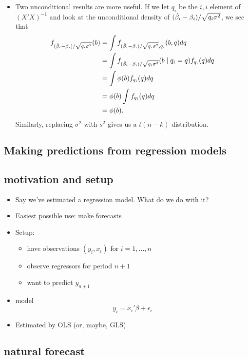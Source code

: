 \begin{itemize}
\item Two unconditional results are more useful.  If we let $q_i$ be
  the $i,i$ element of $(X'X)^{-1}$ and look at the unconditional
  density of $(\hat{\beta}_i - \beta_i)/\sqrt{q_i \sigma^2}$, we see that
  \begin{align*}
    f_{(\hat{\beta}_i - \beta_i)/\sqrt{q_i \sigma^2}}(b)
    &= \int f_{(\hat{\beta}_i - \beta_i)/\sqrt{q_i \sigma^2}, q_i} (b, q) dq \\
    &= \int f_{(\hat{\beta}_i - \beta_i)/\sqrt{q_i \sigma^2}}(b \mid q_i = q) f_{q_i}(q) dq \\
    &= \int \phi(b) f_{q_i}(q) dq \\
    &= \phi(b) \int f_{q_i}(q) dq \\
    &= \phi(b).
  \end{align*}
  Similarly, replacing $\sigma^2$ with $s^2$ gives us a $t(n-k)$ distribution.

\end{itemize}

\subsection{Making predictions from regression models}

\subsection{motivation and setup}
\begin{itemize}
\item Say we've estimated a regression model.  What do we do with it?
\item Easiest possible use: make forecasts
\item Setup:
\begin{itemize}
\item have observations $(y_i, x_i)$ for $i = 1,...,n$
\item observe regressors for period $n+1$
\item want to predict $y_{n+1}$
\end{itemize}
\item model \[ y_i = x_i'\beta + \epsilon_i \]
\item Estimated by OLS (or, maybe, GLS)
\end{itemize}

\subsection{natural forecast}

